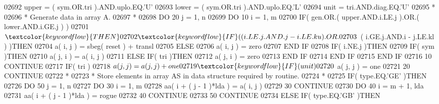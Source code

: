 \begin{DoxyCode}
02692       upper = ( sym.OR.tri ).AND.uplo.EQ.\textcolor{stringliteral}{'U'}
02693       lower = ( sym.OR.tri ).AND.uplo.EQ.\textcolor{stringliteral}{'L'}
02694       unit = tri.AND.diag.EQ.\textcolor{stringliteral}{'U'}
02695 \textcolor{comment}{*}
02696 \textcolor{comment}{*     Generate data in array A.}
02697 \textcolor{comment}{*}
02698       \textcolor{keywordflow}{DO} 20 j = 1, n
02699          \textcolor{keywordflow}{DO} 10 i = 1, m
02700             \textcolor{keywordflow}{IF}( gen.OR.( upper.AND.i.LE.j ).OR.( lower.AND.i.GE.j ) )
02701      $          \textcolor{keywordflow}{THEN}
02702                \textcolor{keywordflow}{IF}( ( i.LE.j.AND.j - i.LE.ku ).OR.
02703      $             ( i.GE.j.AND.i - j.LE.kl ) )\textcolor{keywordflow}{THEN}
02704                   a( i, j ) = sbeg( reset ) + transl
02705                \textcolor{keywordflow}{ELSE}
02706                   a( i, j ) = zero
02707 \textcolor{keywordflow}{               END IF}
02708                \textcolor{keywordflow}{IF}( i.NE.j )\textcolor{keywordflow}{THEN}
02709                   \textcolor{keywordflow}{IF}( sym )\textcolor{keywordflow}{THEN}
02710                      a( j, i ) = a( i, j )
02711                   \textcolor{keywordflow}{ELSE} \textcolor{keywordflow}{IF}( tri )\textcolor{keywordflow}{THEN}
02712                      a( j, i ) = zero
02713 \textcolor{keywordflow}{                  END IF}
02714 \textcolor{keywordflow}{               END IF}
02715 \textcolor{keywordflow}{            END IF}
02716    10    \textcolor{keywordflow}{CONTINUE}
02717          \textcolor{keywordflow}{IF}( tri )
02718      $      a( j, j ) = a( j, j ) + one
02719          \textcolor{keywordflow}{IF}( unit )
02720      $      a( j, j ) = one
02721    20 \textcolor{keywordflow}{CONTINUE}
02722 \textcolor{comment}{*}
02723 \textcolor{comment}{*     Store elements in array AS in data structure required by routine.}
02724 \textcolor{comment}{*}
02725       \textcolor{keywordflow}{IF}( type.EQ.\textcolor{stringliteral}{'GE'} )\textcolor{keywordflow}{THEN}
02726          \textcolor{keywordflow}{DO} 50 j = 1, n
02727             \textcolor{keywordflow}{DO} 30 i = 1, m
02728                aa( i + ( j - 1 )*lda ) = a( i, j )
02729    30       \textcolor{keywordflow}{CONTINUE}
02730             \textcolor{keywordflow}{DO} 40 i = m + 1, lda
02731                aa( i + ( j - 1 )*lda ) = rogue
02732    40       \textcolor{keywordflow}{CONTINUE}
02733    50    \textcolor{keywordflow}{CONTINUE}
02734       \textcolor{keywordflow}{ELSE} \textcolor{keywordflow}{IF}( type.EQ.\textcolor{stringliteral}{'GB'} )\textcolor{keywordflow}{THEN}

\end{DoxyCode}
